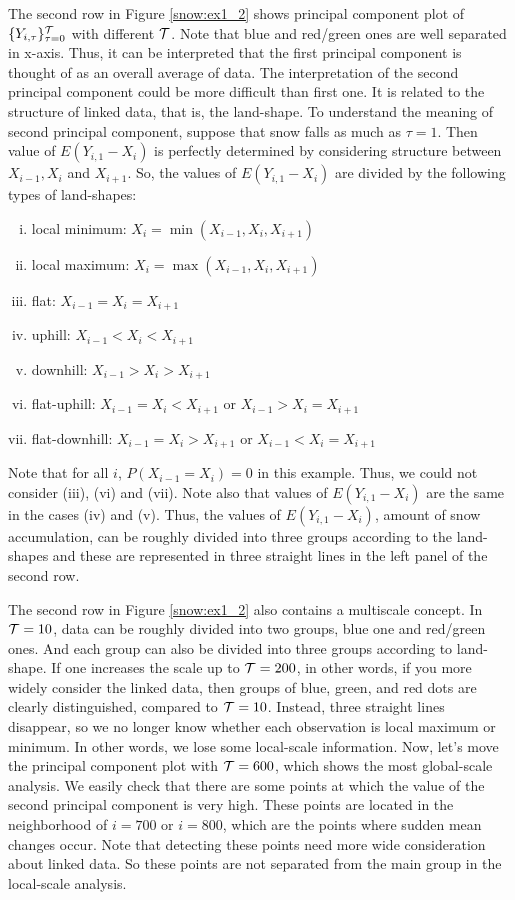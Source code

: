 \documentclass[preprint, review, 12pt]{article}
\theoremstyle{definition}
\theoremstyle{remark}
\begin{document}
The second row in Figure \ref{snow:ex1_2} shows principal component plot of $\{Y_{i,\tau}\}_{\tau=0}^{\cal T}$ with different $\cal T$. Note that blue and red/green ones are well separated in x-axis. Thus, it can be interpreted that the first principal component is thought of as an overall average of data. The interpretation of the second principal component could be more difficult than first one. It is related to the structure of linked data, that is, the land-shape. To understand the meaning of second principal component, suppose that snow falls as much as $\tau=1$. Then value of $E(Y_{i,1}-X_i)$ is perfectly determined by considering structure between $X_{i-1},X_{i}$ and $X_{i+1}$. So, the values of $E(Y_{i,1}-X_i)$ are divided by the following types of land-shapes:
\begin{enumerate}[(i)]
	\item local minimum: $X_i=\min(X_{i-1},X_i,X_{i+1})$
	\item local maximum: $X_i=\max(X_{i-1},X_i,X_{i+1})$
	\item flat: $X_{i-1}=X_i=X_{i+1}$ 
	\item uphill: $X_{i-1}<X_i<X_{i+1}$
	\item downhill: $X_{i-1}>X_i>X_{i+1}$
	\item flat-uphill: $X_{i-1}=X_i<X_{i+1}$ or $X_{i-1}>X_i=X_{i+1}$
	\item flat-downhill: $X_{i-1}=X_i>X_{i+1}$ or $X_{i-1}<X_i=X_{i+1}$
\end{enumerate}
Note that for all $i$, $P(X_{i-1}=X_i)=0$ in this example. Thus, we could not consider (iii), (vi) and (vii). Note also that values of $E(Y_{i,1}-X_i)$ are the same in the cases (iv) and (v). Thus, the values of $E(Y_{i,1}-X_i)$, amount of snow accumulation, can be roughly divided into three groups according to the land-shapes and these are represented in three straight lines in the left panel of the second row. 

The second row in Figure \ref{snow:ex1_2} also contains a multiscale concept. In ${\cal T}=10$, data can be roughly divided into two groups, blue one and red/green ones. And each group can also be divided into three groups according to land-shape. If one increases the scale up to ${\cal T}=200$, in other words, if you more widely consider the linked data, then groups of blue, green, and red dots are clearly distinguished, compared to ${\cal T}=10$. Instead, three straight lines disappear, so we no longer know whether each observation is local maximum or minimum. In other words, we lose some local-scale information. Now, let's move the principal component plot with ${\cal T}=600$, which shows the most global-scale analysis. We easily check that there are some points at which the value of the second principal component is very high. These points are located in the neighborhood of $i=700$ or $i=800$, which are the points where sudden mean changes occur. Note that detecting these points need more wide consideration about linked data. So these points are not separated from the main group in the local-scale analysis. 
\end{document}
